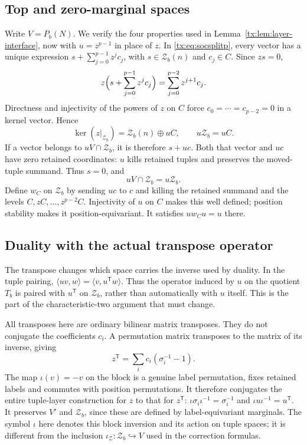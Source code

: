\documentclass[11pt,a4paper,oneside,openany]{book}
\theoremstyle{definition}\newtheorem{definition}[theorem]{Definition}
\theoremstyle{remark}\newtheorem{remark}[theorem]{Remark}
\numberwithin{equation}{chapter}
\begin{document}
\subsection{Top and zero-marginal spaces}
Write $V=P_b(N)$. We verify the four properties used in
Lemma~\ref{tx:lem:layer-interface}, now with $u=z^{p-1}$ in place of
$z$. In \eqref{tx:eq:socsplitp}, every vector has a unique expression
$s+\sum_{j=0}^{p-1}z^jc_j$, with $s\in\mathcal Z_b(n)$ and
$c_j\in C$. Since $zs=0$,
\[
 z\Bigl(s+\sum_{j=0}^{p-1}z^jc_j\Bigr)
                         =\sum_{j=0}^{p-2}z^{j+1}c_j.
\]
Directness and injectivity of the powers of $z$ on $C$ force
$c_0=\cdots=c_{p-2}=0$ in a kernel vector. Hence
\[
 \ker(z|_{\mathcal Z_b})=\mathcal Z_b(n)\oplus uC,
                         \qquad u\mathcal Z_b=uC.
\]
If a vector belongs to $uV\cap\mathcal Z_b$, it is therefore $s+uc$.
Both that vector and $uc$ have zero retained coordinates: $u$ kills
retained tuples and preserves the moved-tuple summand. Thus $s=0$, and
\[
                         uV\cap\mathcal Z_b=u\mathcal Z_b.
\]
Define $w_C$ on $\mathcal Z_b$ by sending $uc$ to $c$ and killing
the retained summand and the levels $C,zC,\ldots,z^{p-2}C$.
Injectivity of $u$ on $C$ makes this well defined; position stability
makes it position-equivariant. It satisfies $uw_Cu=u$ there.

\subsection{Duality with the actual transpose operator}
The transpose changes which space carries the inverse used by
duality. In the tuple pairing, $\langle uv,w\rangle
=\langle v,u^{\mathsf T}w\rangle$. Thus the operator induced by
$u$ on the quotient $T_b$ is paired with $u^{\mathsf T}$ on
$\mathcal Z_b$, rather than automatically with $u$ itself.
This is the part of the characteristic-two argument that must change.

All transposes here are ordinary bilinear matrix transposes. They do
not conjugate the coefficients $c_i$. A permutation matrix transposes
to the matrix of its inverse, giving
\[
 z^{\mathsf T}=\sum_i c_i(\sigma_i^{-1}-1).
\]
The map
$\iota(v)=-v$ on the block is a genuine label permutation, fixes
retained labels and commutes with position permutations. It therefore
conjugates the entire tuple-layer construction for $z$ to that for
$z^{\mathsf T}$: $\iota\sigma_i\iota^{-1}=\sigma_i^{-1}$ and
$\iota u\iota^{-1}=u^{\mathsf T}$. It preserves $V'$ and
$\mathcal Z_b$, since these are defined by label-equivariant marginals.
The symbol $\iota$ here denotes this block inversion and its action
on tuple spaces; it is different from the inclusion
$\iota_{\mathcal Z}:\mathcal Z_b\hookrightarrow V$ used in the
correction formulas.
\end{document}
